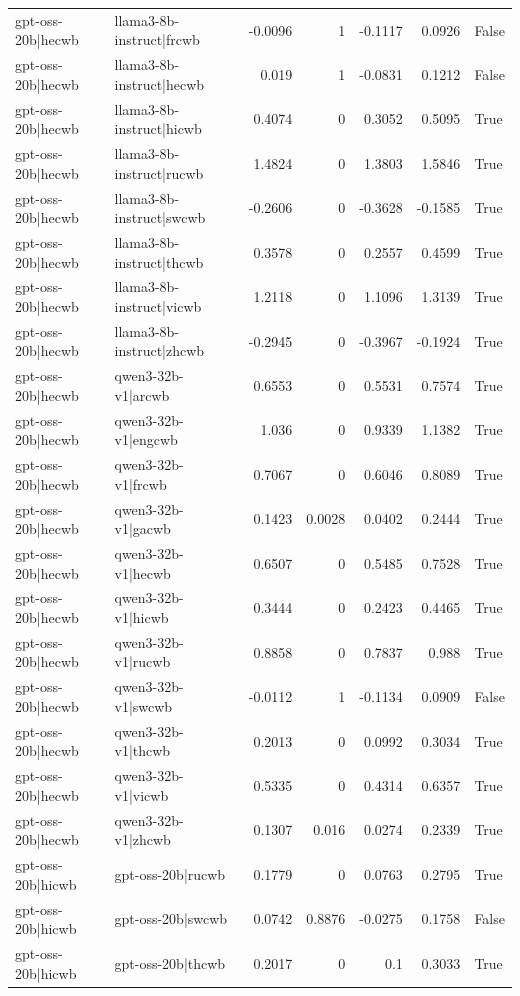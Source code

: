 \begin{table}
\begin{tabular}{l l r r r r l}
gpt-oss-20b|hecwb & llama3-8b-instruct|frcwb & -0.0096 & 1 & -0.1117 & 0.0926 & False \\
gpt-oss-20b|hecwb & llama3-8b-instruct|hecwb & 0.019 & 1 & -0.0831 & 0.1212 & False \\
gpt-oss-20b|hecwb & llama3-8b-instruct|hicwb & 0.4074 & 0 & 0.3052 & 0.5095 & True \\
gpt-oss-20b|hecwb & llama3-8b-instruct|rucwb & 1.4824 & 0 & 1.3803 & 1.5846 & True \\
gpt-oss-20b|hecwb & llama3-8b-instruct|swcwb & -0.2606 & 0 & -0.3628 & -0.1585 & True \\
gpt-oss-20b|hecwb & llama3-8b-instruct|thcwb & 0.3578 & 0 & 0.2557 & 0.4599 & True \\
gpt-oss-20b|hecwb & llama3-8b-instruct|vicwb & 1.2118 & 0 & 1.1096 & 1.3139 & True \\
gpt-oss-20b|hecwb & llama3-8b-instruct|zhcwb & -0.2945 & 0 & -0.3967 & -0.1924 & True \\
gpt-oss-20b|hecwb & qwen3-32b-v1|arcwb & 0.6553 & 0 & 0.5531 & 0.7574 & True \\
gpt-oss-20b|hecwb & qwen3-32b-v1|engcwb & 1.036 & 0 & 0.9339 & 1.1382 & True \\
gpt-oss-20b|hecwb & qwen3-32b-v1|frcwb & 0.7067 & 0 & 0.6046 & 0.8089 & True \\
gpt-oss-20b|hecwb & qwen3-32b-v1|gacwb & 0.1423 & 0.0028 & 0.0402 & 0.2444 & True \\
gpt-oss-20b|hecwb & qwen3-32b-v1|hecwb & 0.6507 & 0 & 0.5485 & 0.7528 & True \\
gpt-oss-20b|hecwb & qwen3-32b-v1|hicwb & 0.3444 & 0 & 0.2423 & 0.4465 & True \\
gpt-oss-20b|hecwb & qwen3-32b-v1|rucwb & 0.8858 & 0 & 0.7837 & 0.988 & True \\
gpt-oss-20b|hecwb & qwen3-32b-v1|swcwb & -0.0112 & 1 & -0.1134 & 0.0909 & False \\
gpt-oss-20b|hecwb & qwen3-32b-v1|thcwb & 0.2013 & 0 & 0.0992 & 0.3034 & True \\
gpt-oss-20b|hecwb & qwen3-32b-v1|vicwb & 0.5335 & 0 & 0.4314 & 0.6357 & True \\
gpt-oss-20b|hecwb & qwen3-32b-v1|zhcwb & 0.1307 & 0.016 & 0.0274 & 0.2339 & True \\
gpt-oss-20b|hicwb & gpt-oss-20b|rucwb & 0.1779 & 0 & 0.0763 & 0.2795 & True \\
gpt-oss-20b|hicwb & gpt-oss-20b|swcwb & 0.0742 & 0.8876 & -0.0275 & 0.1758 & False \\
gpt-oss-20b|hicwb & gpt-oss-20b|thcwb & 0.2017 & 0 & 0.1 & 0.3033 & True \\

\end{tabular}
\end{table}
